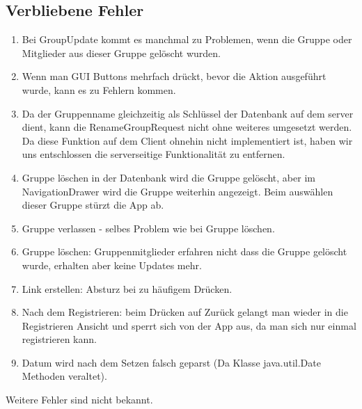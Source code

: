 \subsection{Verbliebene Fehler}
	\begin{enumerate}
		\item Bei GroupUpdate kommt es manchmal zu Problemen, wenn die Gruppe oder Mitglieder aus dieser Gruppe gelöscht wurden.
		\item Wenn man GUI Buttons mehrfach drückt, bevor die Aktion ausgeführt wurde, kann es zu Fehlern kommen.
		\item Da der Gruppenname gleichzeitig als Schlüssel der Datenbank auf dem server dient, kann die RenameGroupRequest nicht ohne weiteres umgesetzt werden. Da diese Funktion auf dem Client ohnehin nicht implementiert ist, haben wir uns entschlossen die serverseitige Funktionalität zu entfernen.
		\item Gruppe löschen in der Datenbank wird die Gruppe gelöscht, aber im NavigationDrawer wird die Gruppe weiterhin angezeigt. Beim auswählen dieser Gruppe stürzt die App ab.
		\item Gruppe verlassen - selbes Problem wie bei Gruppe löschen.
          \item Gruppe löschen: Gruppenmitglieder erfahren nicht dass die Gruppe gelöscht wurde, erhalten aber keine Updates mehr.
          \item Link erstellen: Absturz bei zu häufigem Drücken.
          \item Nach dem Registrieren: beim Drücken auf Zurück gelangt man wieder in die Registrieren Ansicht und sperrt sich von der App aus, da man sich nur einmal registrieren kann.
          \item Datum wird nach dem Setzen falsch geparst (Da Klasse java.util.Date Methoden veraltet).
	\end{enumerate}

	Weitere Fehler sind nicht bekannt.
